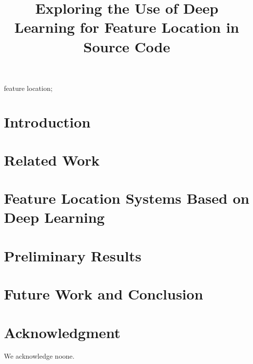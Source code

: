 \documentclass[conference]{IEEEtran}
\begin{document}
\title{Exploring the Use of Deep Learning for Feature Location in Source Code}
\author{
    \and
    \and
}


\maketitle

\begin{abstract}
\end{abstract}

\begin{IEEEkeywords}
feature location;
\end{IEEEkeywords}

\section{Introduction}\label{introduction}         


\section{Related Work}\label{related}


\section{Feature Location Systems Based on Deep Learning}\label{design}


\section{Preliminary Results}\label{results}


\section{Future Work and Conclusion}\label{futurework}


\section*{Acknowledgment}
We acknowledge noone.



\end{document}
